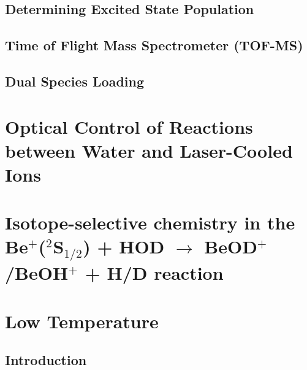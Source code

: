 \documentclass [PhD,nolistoftables,scheader] {uclathes}
\begin{document}
	\section{Determining Excited State Population}
	

	\section{Time of Flight Mass Spectrometer (TOF-MS)} \label{sec: TOF}
	
	
	\section{Dual Species Loading} \label{sec: dual loading}
	

\chapter{Optical Control of Reactions between Water and Laser-Cooled  Ions} \label{sec: Be+H2O}
%	
	

\chapter{Isotope-selective chemistry in the Be$^+$($^2$S$_{1/2}$) + HOD $\rightarrow$ BeOD$^+$/BeOH$^+$ + H/D reaction}
	

%	
%	
%	

\chapter{Low Temperature } \label{sec: [HCO]}

	\section{Introduction}
	
	
\end{document}
